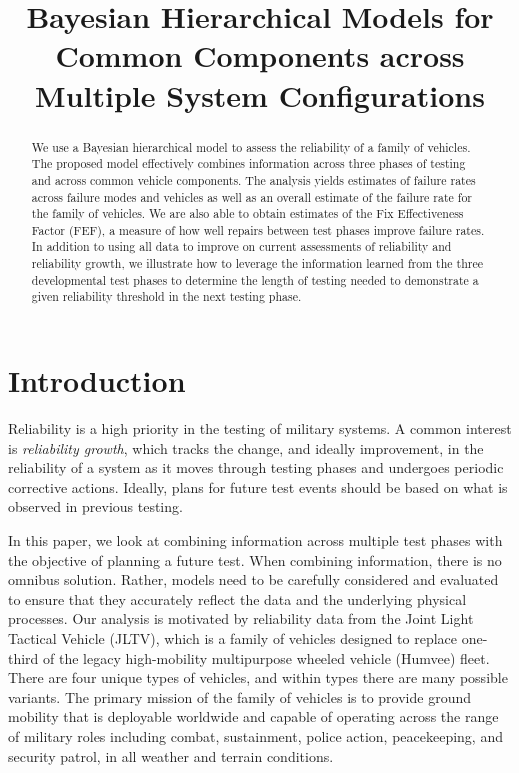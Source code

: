 \documentclass[12pt]{article}
\begin{document}
\title{Bayesian Hierarchical Models for Common Components across Multiple System
Configurations}

\begin{abstract}
    We use a Bayesian hierarchical model to assess the reliability of a family
    of vehicles. The proposed model effectively combines information across
    three phases of testing and across common vehicle components. The analysis
    yields estimates of failure rates across failure modes and vehicles as well
    as an overall estimate of the failure rate for the family of vehicles. We
    are also able to obtain estimates of the Fix Effectiveness Factor (FEF), a
    measure of how well repairs between test phases improve failure rates. In
    addition to using all data to improve on current assessments of reliability
    and reliability growth, we illustrate how to leverage the information
    learned from the three developmental test phases to determine the length of
    testing needed to demonstrate a given reliability threshold in the next
    testing phase.
\end{abstract}

\section{Introduction}
Reliability is a high priority in the testing of military systems. A common
interest is {\em reliability growth}, which tracks the change, and ideally
improvement, in the reliability of a system as it moves through testing phases
and undergoes periodic corrective actions. Ideally, plans for future test events
should be based on what is observed in previous testing.

In this paper, we look at combining information across multiple test phases with
the objective of planning a future test. When combining information, there is no
omnibus solution. Rather, models need to be carefully considered and evaluated
to ensure that they accurately reflect the data and the underlying physical
processes. Our analysis is motivated by reliability data from the Joint Light
Tactical Vehicle (JLTV), which is a family of vehicles designed to replace
one-third of the legacy high-mobility multipurpose wheeled vehicle (Humvee)
fleet. There are four unique types of vehicles, and within types there are many
possible variants. The primary mission of the family of vehicles is to provide
ground mobility that is deployable worldwide and capable of operating across the
range of military roles including combat, sustainment, police action,
peacekeeping, and security patrol, in all weather and terrain conditions.
\end{document}
